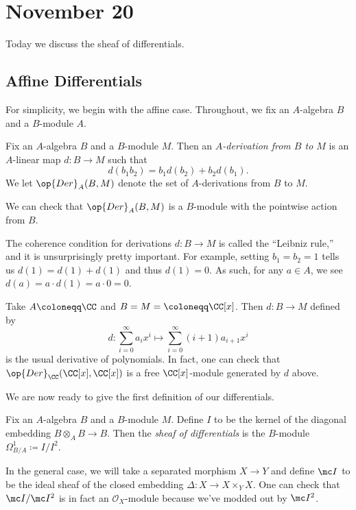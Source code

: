 \documentclass[../notes.tex]{subfiles}
\begin{document}
\section{November 20}

Today we discuss the sheaf of differentials.

\subsection{Affine Differentials}
For simplicity, we begin with the affine case. Throughout, we fix an $A$-algebra $B$ and a $B$-module $A$.
\begin{definition}[Derivation]
	Fix an $A$-algebra $B$ and a $B$-module $M$. Then an \textit{$A$-derivation from $B$ to $M$} is an $A$-linear map $d\colon B\to M$ such that
	\[d(b_1b_2)=b_1d(b_2)+b_2d(b_1).\]
	We let $\op{Der}_A(B,M)$ denote the set of $A$-derivations from $B$ to $M$.
\end{definition}
\begin{remark}
	We can check that $\op{Der}_A(B,M)$ is a $B$-module with the pointwise action from $B$.
\end{remark}
\begin{remark}
	The coherence condition for derivations $d\colon B\to M$ is called the ``Leibniz rule,'' and it is unsurprisingly pretty important. For example, setting $b_1=b_2=1$ tells us $d(1)=d(1)+d(1)$ and thus $d(1)=0$. As such, for any $a\in A$, we see $d(a)=a\cdot d(1)=a\cdot0=0$.
\end{remark}
\begin{example}
	Take $A\coloneqq\CC$ and $B=M=\coloneqq\CC[x]$. Then $d\colon B\to M$ defined by
	\[d\colon\sum_{i=0}^\infty a_ix^i\mapsto\sum_{i=0}^\infty (i+1)a_{i+1}x^i\]
	is the usual derivative of polynomials. In fact, one can check that $\op{Der}_\CC(\CC[x],\CC[x])$ is a free $\CC[x]$-module generated by $d$ above.
\end{example}
We are now ready to give the first definition of our differentials.
\begin{definition}
	Fix an $A$-algebra $B$ and a $B$-module $M$. Define $I$ to be the kernel of the diagonal embedding $B\otimes_AB\to B$. Then the \textit{sheaf of differentials} is the $B$-module $\Omega^1_{B/A}\coloneqq I/I^2$.
\end{definition}
\begin{remark}
	In the general case, we will take a separated morphism $X\to Y$ and define $\mc I$ to be the ideal sheaf of the closed embedding $\Delta\colon X\to X\times_YX$. One can check that $\mc I/\mc I^2$ is in fact an $\mathcal O_X$-module because we've modded out by $\mc I^2$.
\end{remark}
\end{document}
